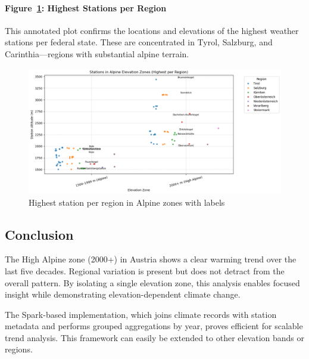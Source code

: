 \paragraph{Figure~\ref{fig:highest_stations_labeled}: Highest Stations per Region}
This annotated plot confirms the locations and elevations of the highest weather stations per federal state. These are concentrated in Tyrol, Salzburg, and Carinthia—regions with substantial alpine terrain.

\begin{figure}[htbp]
    \centering
    \includegraphics[width=\textwidth]{img/highest_stations_labeled.png}
    \caption{Highest station per region in Alpine zones with labels}
    \label{fig:highest_stations_labeled}
\end{figure}

\subsection*{Conclusion}
The High Alpine zone (2000+\m) in Austria shows a clear warming trend over the last five decades. Regional variation is present but does not detract from the overall pattern. By isolating a single elevation zone, this analysis enables focused insight while demonstrating elevation-dependent climate change.

The Spark-based implementation, which joins climate records with station metadata and performs grouped aggregations by year, proves efficient for scalable trend analysis. This framework can easily be extended to other elevation bands or regions.
